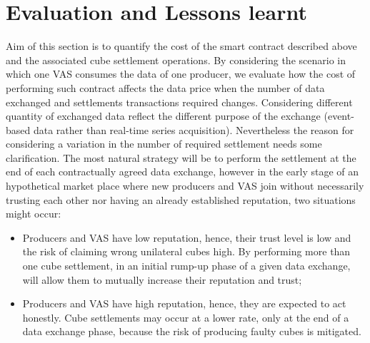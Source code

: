 \documentclass[chi_draft]{sigchi}
\begin{document}
{\begin{table}[]
	\centering
	\caption{Execution cost of cube settlment contract operations.}
	\label{tab:execution_costl}
	\tiny 
\end{table}
\vspace{-10pt}

\section{Evaluation and Lessons learnt}
\label{sec:evaluation}
Aim of this section is to quantify the cost of the smart contract described above and the associated cube settlement operations. By considering the scenario in which one VAS consumes the data of one producer, we evaluate how the cost of performing such contract affects the data price when the number of data exchanged and settlements transactions required changes. Considering different quantity of exchanged data reflect the different purpose of the exchange (event-based data rather than real-time series acquisition). Nevertheless the reason for considering a variation in the number of required settlement needs some clarification. The most natural strategy will be to perform the settlement at the end of each contractually agreed data exchange, however in the early stage of an hypothetical market place where new producers and VAS join without necessarily trusting each other nor having an already established reputation, two situations might occur:
\begin{itemize}
	\item Producers and VAS have low reputation, hence, their trust level is low and the risk of claiming wrong unilateral cubes high. By performing more than one cube settlement, in an initial rump-up phase of a given data exchange, will allow them to mutually increase their reputation and trust;
	\vspace{-5pt}
	\item Producers and VAS have high reputation, hence, they are expected to act honestly. Cube settlements may occur at a lower rate, only at the end of a data exchange phase, because the risk of producing faulty cubes is mitigated.
\end{itemize}

}
\end{document}
